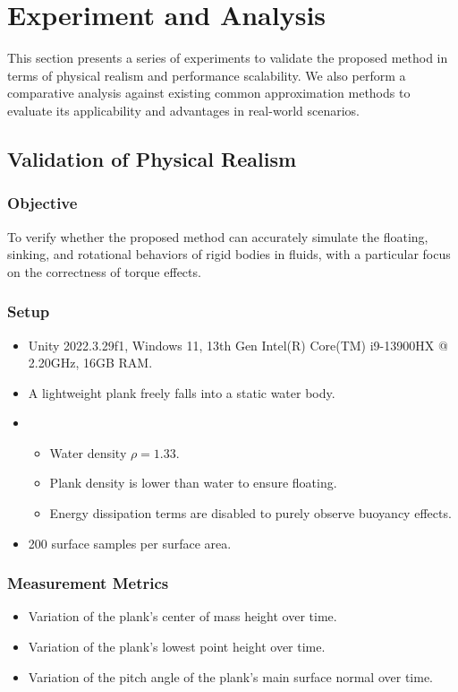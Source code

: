 \section{Experiment and Analysis}

This section presents a series of experiments to validate the proposed method in terms of physical realism and performance scalability. We also perform a comparative analysis against existing common approximation methods to evaluate its applicability and advantages in real-world scenarios.

\subsection*{Validation of Physical Realism}

\subsubsection*{Objective}
To verify whether the proposed method can accurately simulate the floating, sinking, and rotational behaviors of rigid bodies in fluids, with a particular focus on the correctness of torque effects.

\subsubsection*{Setup}
\begin{itemize}
		\item {} Unity 2022.3.29f1, Windows 11, 13th Gen Intel(R) Core(TM) i9-13900HX @ 2.20GHz, 16GB RAM.
		\item {} A lightweight plank freely falls into a static water body.
		\item {}
		\begin{itemize}
				\item Water density $\rho = 1.33$.
				\item Plank density is lower than water to ensure floating.
				\item Energy dissipation terms are disabled to purely observe buoyancy effects.
		\end{itemize}
		\item {} 200 surface samples per surface area.
\end{itemize}

\subsubsection*{Measurement Metrics}
\begin{itemize}
		\item Variation of the plank's center of mass height over time.
		\item Variation of the plank's lowest point height over time.
		\item Variation of the pitch angle of the plank's main surface normal over time.
\end{itemize}

